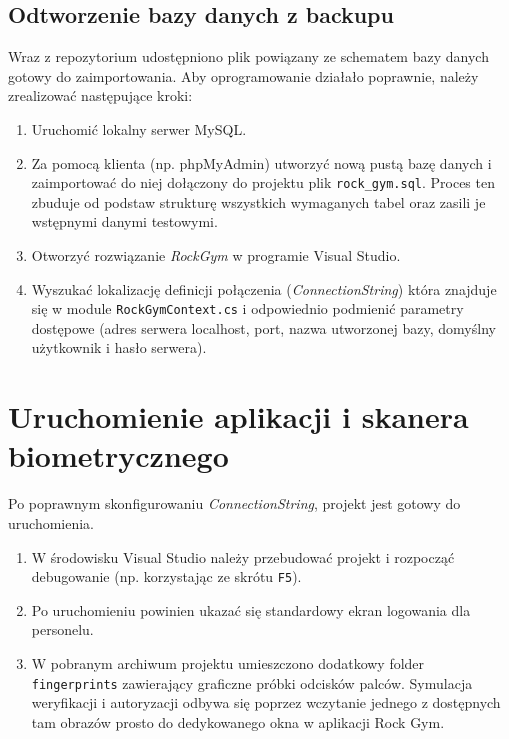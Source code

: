 \subsection{Odtworzenie bazy danych z backupu}
Wraz z repozytorium udostępniono plik powiązany ze schematem bazy danych gotowy do zaimportowania. Aby oprogramowanie działało poprawnie, należy zrealizować następujące kroki:
\begin{enumerate}
    \item Uruchomić lokalny serwer MySQL.
    \item Za pomocą klienta (np. phpMyAdmin) utworzyć nową pustą bazę danych i zaimportować do niej dołączony do projektu plik \texttt{rock\_gym.sql}. Proces ten zbuduje od podstaw strukturę wszystkich wymaganych tabel oraz zasili je wstępnymi danymi testowymi.
    \item Otworzyć rozwiązanie \textit{RockGym} w programie Visual Studio.
    \item Wyszukać lokalizację definicji połączenia (\textit{ConnectionString}) która znajduje się w module \texttt{RockGymContext.cs} i odpowiednio podmienić parametry dostępowe (adres serwera localhost, port, nazwa utworzonej bazy, domyślny użytkownik i hasło serwera).
\end{enumerate}

\section{Uruchomienie aplikacji i skanera biometrycznego}
Po poprawnym skonfigurowaniu \textit{ConnectionString}, projekt jest gotowy do uruchomienia.
\begin{enumerate}
    \item W środowisku Visual Studio należy przebudować projekt i rozpocząć debugowanie (np. korzystając ze skrótu \texttt{F5}).
    \item Po uruchomieniu powinien ukazać się standardowy ekran logowania dla personelu.
    \item W pobranym archiwum projektu umieszczono dodatkowy folder \texttt{fingerprints} zawierający graficzne próbki odcisków palców. Symulacja weryfikacji i autoryzacji odbywa się poprzez wczytanie jednego z dostępnych tam obrazów prosto do dedykowanego okna w aplikacji Rock Gym.
\end{enumerate}

